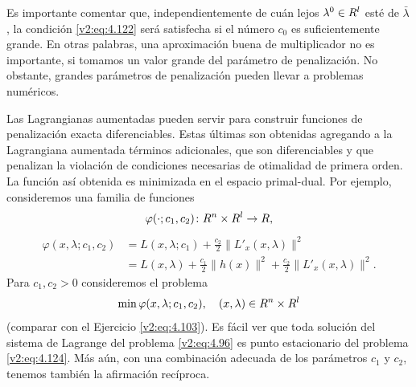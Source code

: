 Es importante comentar que, independientemente de cuán lejos $\lambda^0 \in R^l$ esté de $\bar{\lambda}$, la condición \eqref{v2:eq:4.122} será satisfecha si el número $c_0$ es suficientemente grande. En otras palabras, una aproximación buena de multiplicador no es importante, si tomamos un valor grande del parámetro de penalización. No obstante, grandes parámetros de penalización pueden llevar a problemas numéricos.


Las Lagrangianas aumentadas pueden servir para construir funciones de penalización exacta diferenciables. Estas últimas son obtenidas agregando a la Lagrangiana aumentada términos adicionales, que son diferenciables y que penalizan la violación de condiciones necesarias de otimalidad de primera orden. La función así obtenida es minimizada en el espacio primal-dual. Por ejemplo, consideremos una familia de funciones
\[
    \varphi(\cdot; c_1, c_2) \colon R^n \times R^l \to R,
\]
\begin{align}
    \varphi(x, \lambda; c_1, c_2) &= L(x, \lambda; c_1) + \frac{c_2}{2}\|L'_x(x, \lambda)\|^2 \label{v2:eq:4.123} \\
    &= L(x, \lambda) + \frac{c_1}{2}\|h(x)\|^2 + \frac{c_2}{2}\|L'_x(x, \lambda)\|^2. \nonumber
\end{align}
Para $c_1, c_2 > 0$ consideremos el problema
\begin{equation}
    \min \varphi(x, \lambda; c_1, c_2), \quad (x, \lambda) \in R^n \times R^l
    \label{v2:eq:4.124}
\end{equation}
(comparar con el Ejercicio \eqref{v2:eq:4.103}). Es fácil ver que toda solución del sistema de Lagrange del problema \eqref{v2:eq:4.96} es punto estacionario del problema \eqref{v2:eq:4.124}. Más aún, con una combinación adecuada de los parámetros $c_1$ y $c_2$, tenemos también la afirmación recíproca.

